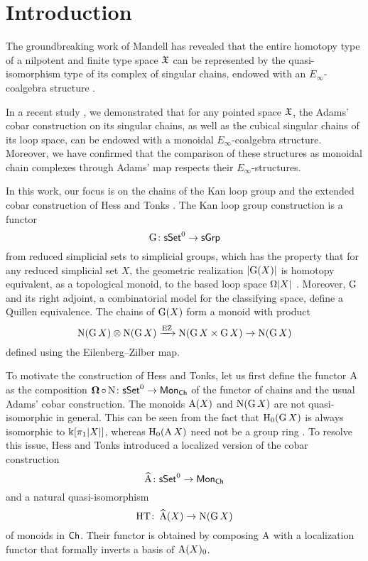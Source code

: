 
\section{Introduction}

The groundbreaking work of Mandell has revealed that the entire homotopy type of a nilpotent and finite type space $\mathfrak{X}$ can be represented by the quasi-isomorphism type of its complex of singular chains, endowed with an $E_\infty$-coalgebra structure \cite{mandell2006homotopy_type}.

In a recent study \cite{medina2021cobar}, we demonstrated that for any pointed space $\mathfrak{X}$, the Adams' cobar construction on its singular chains, as well as the cubical singular chains of its loop space, can be endowed with a monoidal $E_\infty$-coalgebra structure. Moreover, we have confirmed that the comparison of these structures as monoidal chain complexes through Adams' map respects their $E_\infty$-structures.

In this work, our focus is on the chains of the Kan loop group \cite{bibid} and the extended cobar construction of Hess and Tonks \cite{hess2010cobar}.
The Kan loop group construction is a functor
\[
\operatorname{G} \colon \mathsf{sSet}^0 \to \mathsf{sGrp}
\]
from reduced simplicial sets to simplicial groups, which has the property that for any reduced simplicial set $X$, the geometric realization $\lvert\operatorname{G}(X)\rvert$ is homotopy equivalent, as a topological monoid, to the based loop space $\Omega\lvert X\rvert$ \cite{berger1995loops}.
Moreover, $\operatorname{G}$ and its right adjoint, a combinatorial model for the classifying space, define a Quillen equivalence.
The chains of $\operatorname{G}(X)$ form a monoid with product
\[
\operatorname{N}(\operatorname{G} X) \otimes \operatorname{N}(\operatorname{G} X) \xrightarrow{\operatorname{EZ}} \operatorname{N}(\operatorname{G} X \times \operatorname{G} X) \to \operatorname{N}(\operatorname{G} X)
\]
defined using the Eilenberg--Zilber map.

To motivate the construction of Hess and Tonks, let us first define the functor $\operatorname{A}$ as the composition $\operatorname{\mathbf{\Omega}} \circ \operatorname{N} \colon \mathsf{sSet}^0 \to \mathsf{Mon}_{\mathsf{Ch}}$ of the functor of chains and the usual Adams' cobar construction.
The monoids $\operatorname{A}(X)$ and $\operatorname{N}(\operatorname{G} X)$ are not quasi-isomorphic in general.
This can be seen from the fact that $\mathrm{H}_0(\operatorname{G} X)$ is always isomorphic to $ \Bbbk[\pi_1 |X|]$, whereas $\mathrm{H}_0(\operatorname{A} X)$ need not be a group ring .
To resolve this issue, Hess and Tonks introduced a localized version of the cobar construction
\[
\operatorname{\widehat{A}} \colon \mathsf{sSet}^0 \to \mathsf{Mon}_{\mathsf{Ch}}
\]
and a natural quasi-isomorphism
\[
\operatorname{HT} \colon \operatorname{\widehat{A}}(X) \to \operatorname{N}(\operatorname{G} X)
\]
of monoids in $\mathsf{Ch}$.
Their functor is obtained by composing $\operatorname{A}$ with a localization functor that formally inverts a basis of $\operatorname{A}(X)_0$.

